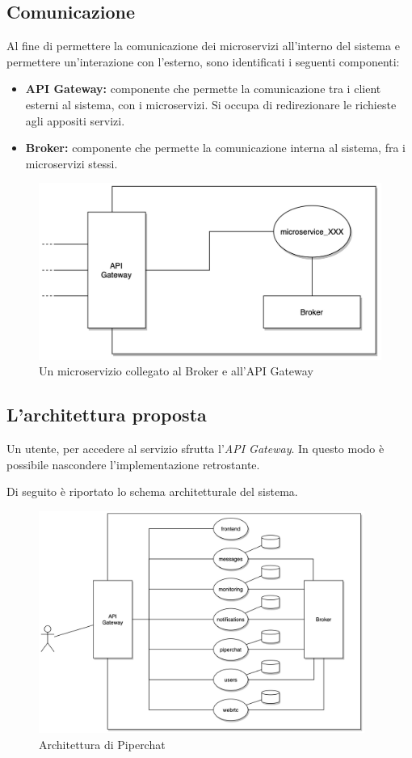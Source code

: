 %
%
%
\subsection{Comunicazione}

Al fine di permettere la comunicazione dei microservizi all'interno del sistema e permettere un'interazione con l'esterno, sono identificati i seguenti componenti:

\begin{itemize}
    \item \textbf{API Gateway:} componente che permette la comunicazione tra i client esterni al sistema, con i microservizi. Si occupa di redirezionare le richieste agli appositi servizi.

    \item \textbf{Broker:} componente che permette la comunicazione interna al sistema, fra i microservizi stessi.
\end{itemize}

\begin{figure}[htbp]
    \centering
    \includegraphics[width=\textwidth]{img/03-design/gateway-broker-microservice.jpg}
    \caption{Un microservizio collegato al Broker e all'API Gateway}
    \label{fig:gateway-broker-microservice}
\end{figure}

%
%
%
\subsection{L'architettura proposta}

Un utente, per accedere al servizio sfrutta l'\emph{API Gateway}.
In questo modo è possibile nascondere l'implementazione retrostante.

Di seguito è riportato lo schema architetturale del sistema.

\begin{figure}[htbp]
    \centering
    \includegraphics[angle=-90,width=0.95\textwidth]{img/03-design/architecture-schema.jpg}
    \caption{Architettura di Piperchat}
    \label{fig:piperchat-architecture}
\end{figure}
